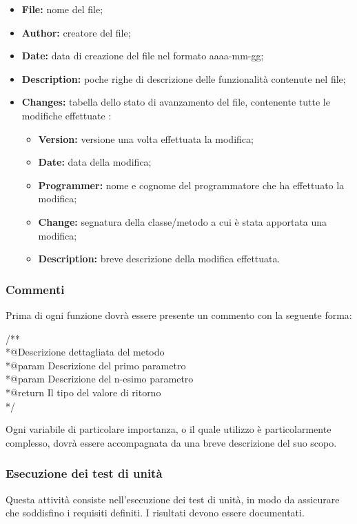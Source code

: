 \begin{itemize}
	\item \textbf{File:} nome del file;
	\item \textbf{Author:} creatore del file;
	\item \textbf{Date:} data di creazione del file nel formato aaaa-mm-gg;
	\item \textbf{Description:} poche righe di descrizione delle funzionalità contenute nel file;
	\item \textbf{Changes:} tabella dello stato di avanzamento del file, contenente tutte le modifiche effettuate :
		\begin{itemize}
			\item \textbf{Version:} versione una volta effettuata la modifica;
			\item \textbf{Date:} data della modifica;
			\item \textbf{Programmer:} nome e cognome del programmatore che ha effettuato la modifica;
			\item \textbf{Change:} segnatura della classe/metodo a cui è stata apportata una modifica;
			\item \textbf{Description:} breve descrizione della modifica effettuata.
		\end{itemize}
\end{itemize}

\subsubsection{Commenti}

Prima di ogni funzione dovrà essere presente un commento con la seguente forma:

\begin{flushleft}
	/**\\
	 *@Descrizione dettagliata del metodo\\
	 *@param Descrizione del primo parametro\\
	 *@param Descrizione del n-esimo parametro\\
	 *@return Il tipo del valore di ritorno\\
	*/
\end{flushleft}

Ogni variabile di particolare importanza, o il quale utilizzo è particolarmente complesso, dovrà essere accompagnata da una breve descrizione del suo scopo.

\subsubsection{Esecuzione dei test di unità}
Questa attività consiste nell'esecuzione dei test di unità, in modo da assicurare che soddisfino i requisiti definiti. I risultati devono essere documentati.

